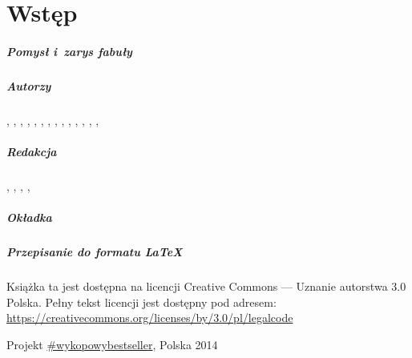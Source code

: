 \chapter{Wstęp}

\paragraph{Pomysł i~zarys fabuły}

\vfill

\paragraph{Autorzy}
, 
, 
, 
, 
, 
, 
, 
, 
, 
, 
, 
, 
, 
, 

\vfill

\paragraph{Redakcja}
, 
, 
, 
, 

\vfill

\paragraph{Okładka}

\vfill

\paragraph{Przepisanie do formatu \LaTeX}

\vfill

\begin{center}
\noindent
\footnotesize Książka ta jest dostępna na licencji Creative Commons --- Uznanie autorstwa 3.0 Polska. Pełny tekst licencji jest dostępny pod adresem: \url{https://creativecommons.org/licenses/by/3.0/pl/legalcode}

\vspace{6pt}

\normalsize\cc\ccby Projekt \href{http://www.wykop.pl/tag/wykopowybestseller/}{\#wykopowybestseller}, Polska 2014
\end{center}
